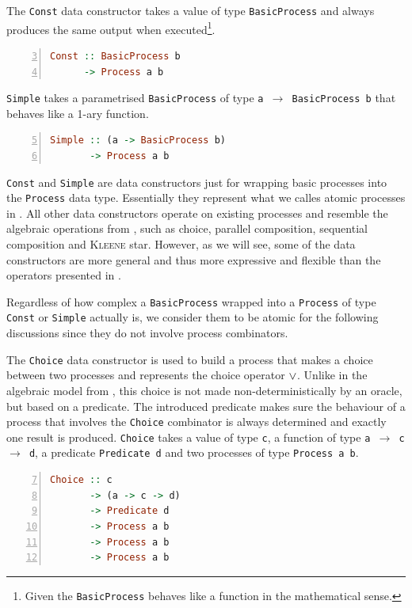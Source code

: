 The \texttt{Const} data constructor takes a value of type \texttt{BasicProcess} and always produces the same output when executed\footnote{Given the \texttt{BasicProcess} behaves like a function in the mathematical sense.}.
\begin{lstlisting}[language=Haskell,caption=Signature of the \texttt{Const} data constructor.,numbers=left,frame=bt,firstnumber=3]
Const :: BasicProcess b
      -> Process a b
\end{lstlisting}

\texttt{Simple} takes a parametrised \texttt{BasicProcess} of type \texttt{a $\to$ BasicProcess b} that behaves like a 1-ary function.
\begin{lstlisting}[language=Haskell,caption=Signature of the \texttt{Simple} data constructor.,numbers=left,frame=bt,firstnumber=5]
Simple :: (a -> BasicProcess b)
       -> Process a b
\end{lstlisting}

\texttt{Const} and \texttt{Simple} are data constructors just for wrapping basic processes into the \texttt{Process} data type. Essentially they represent what we calles atomic processes in . All other data constructors operate on existing processes and resemble the algebraic operations from , such as choice, parallel composition, sequential composition and \textsc{Kleene} star. However, as we will see, some of the data constructors are more general and thus more expressive and flexible than the operators presented in .

Regardless of how complex a \texttt{BasicProcess} wrapped into a \texttt{Process} of type \texttt{Const} or \texttt{Simple} actually is, we consider them to be atomic for the following discussions since they do not involve process combinators.

The \texttt{Choice} data constructor is used to build a process that makes a choice between two processes and represents the choice operator $\vee$. Unlike in the algebraic model from , this choice is not made non-deterministically by an oracle, but based on a predicate. The introduced predicate makes sure the behaviour of a process that involves the \texttt{Choice} combinator is always determined and exactly one result is produced. \texttt{Choice} takes a value of type \texttt{c}, a function of type \texttt{a $\to$ c $\to$ d}, a predicate \texttt{Predicate d} and two processes of type \texttt{Process a b}.
\begin{lstlisting}[language=Haskell,caption=Signature of the \texttt{Choice} data constructor.,numbers=left,frame=bt,firstnumber=7]
Choice :: c
       -> (a -> c -> d)
       -> Predicate d
       -> Process a b
       -> Process a b
       -> Process a b
\end{lstlisting}


